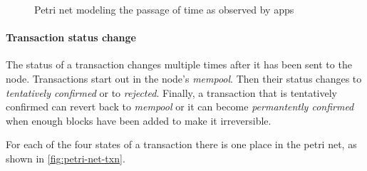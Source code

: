 \begin{figure}
  \centering
\caption{Petri net modeling the passage of time as observed by \glspl{app}}
\label{fig:petri-net-time}
\end{figure}

\paragraph{Transaction status change}

The status of a transaction changes multiple times after it has been sent to the node.
Transactions start out in the node's \emph{mempool}.
Then their status changes to \emph{tentatively confirmed} or to \emph{rejected}.
Finally, a transaction that is tentatively confirmed can revert back to \emph{mempool} or it can become \emph{permantently confirmed} when enough blocks have been added to make it irreversible.

For each of the four states of a transaction there is one place in the petri net, as shown in \ref{fig:petri-net-txn}.

